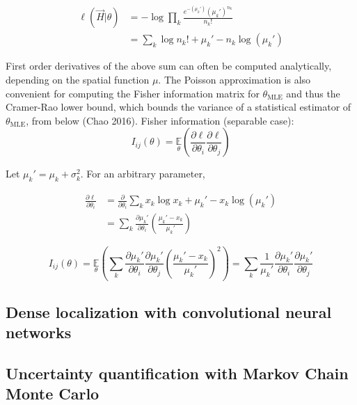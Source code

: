\documentclass{ucetd}
\begin{document}
\begin{align}
\ell(\vec{H}|\theta) &= -\log \prod_{k} \frac{e^{-\left(\mu_{k}'\right)}\left(\mu_{k}'\right)^{n_{k}}}{n_{k}!}\\
&= \sum_{k}  \log n_{k}! + \mu_{k}' - n_{k}\log\left(\mu_{k}'\right)
\end{align}

First order derivatives of the above sum can often be computed analytically, depending on the spatial function $\mu$. The Poisson approximation is also convenient for computing the Fisher information matrix for $\theta_{\mathrm{MLE}}$ and thus the Cramer-Rao lower bound, which bounds the variance of a statistical estimator of $\theta_{\mathrm{MLE}}$, from below (Chao 2016).
Fisher information (separable case): \begin{equation}
I_{ij}(\theta) = \underset{\theta}{\mathbb{E}}\left(\frac{\partial \ell}{\partial\theta_{i}}\frac{\partial\ell}{\partial\theta_{j}}\right) 
\end{equation}

Let $\mu_{k}' = \mu_{k} + \sigma_{k}^{2}$. For an arbitrary parameter,

\begin{align*}
\frac{\partial \ell}{\partial \theta_{i}} &= \frac{\partial}{\partial \theta_{i}} \sum_{k}  x_{k}\log x_{k} + \mu_{k}' - x_{k}\log\left(\mu_{k}'\right)\\
&= \sum_{k} \frac{\partial \mu_{k}'}{\partial\theta_{i}} \left(\frac{\mu_{k}'-x_{k}}{\mu_{k}'}\right)
\end{align*}

\begin{equation*}
I_{ij}(\theta) = \underset{\theta}{\mathbb{E}}\left(\sum_{k}\frac{\partial \mu_{k}'}{\partial\theta_{i}}\frac{\partial \mu_{k}'}{\partial\theta_{j}} \left(\frac{\mu_{k}'-x_{k}}{\mu_{k}'}\right)^{2}\right) = \sum_{k}\frac{1}{\mu_{k}'}\frac{\partial \mu_{k}'}{\partial\theta_{i}}\frac{\partial \mu_{k}'}{\partial\theta_{j}}
\end{equation*}

\subsection{Dense localization with convolutional neural networks}

\subsection{Uncertainty quantification with Markov Chain Monte Carlo}
\end{document}
